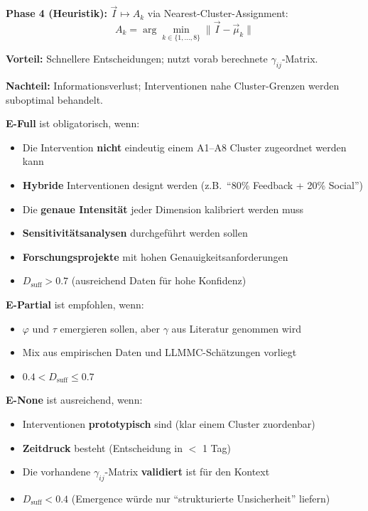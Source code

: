 \textbf{Phase 4 (Heuristik):} $\vec{I} \mapsto A_k$ via Nearest-Cluster-Assignment:
\begin{equation}
A_k = \arg\min_{k \in \{1,...,8\}} \|\vec{I} - \vec{\mu}_k\|
\end{equation}

\textbf{Vorteil:} Schnellere Entscheidungen; nutzt vorab berechnete $\gamma_{ij}$-Matrix.

\textbf{Nachteil:} Informationsverlust; Interventionen nahe Cluster-Grenzen werden suboptimal behandelt.

\begin{tcolorbox}[colback=yellow!5!white, colframe=yellow!75!black,
    title=\textbf{Wann welchen Emergenz-Modus wählen?}]

\textbf{E-Full} ist obligatorisch, wenn:
\begin{itemize}[nosep]
\item Die Intervention \textbf{nicht} eindeutig einem A1--A8 Cluster zugeordnet werden kann
\item \textbf{Hybride} Interventionen designt werden (z.B.\ ``80\% Feedback + 20\% Social'')
\item Die \textbf{genaue Intensität} jeder Dimension kalibriert werden muss
\item \textbf{Sensitivitätsanalysen} durchgeführt werden sollen
\item \textbf{Forschungsprojekte} mit hohen Genauigkeitsanforderungen
\item $D_{\text{suff}} > 0.7$ (ausreichend Daten für hohe Konfidenz)
\end{itemize}

\textbf{E-Partial} ist empfohlen, wenn:
\begin{itemize}[nosep]
\item $\varphi$ und $\tau$ emergieren sollen, aber $\gamma$ aus Literatur genommen wird
\item Mix aus empirischen Daten und LLMMC-Schätzungen vorliegt
\item $0.4 < D_{\text{suff}} \leq 0.7$
\end{itemize}

\textbf{E-None} ist ausreichend, wenn:
\begin{itemize}[nosep]
\item Interventionen \textbf{prototypisch} sind (klar einem Cluster zuordenbar)
\item \textbf{Zeitdruck} besteht (Entscheidung in $<$ 1 Tag)
\item Die vorhandene $\gamma_{ij}$-Matrix \textbf{validiert} ist für den Kontext
\item $D_{\text{suff}} < 0.4$ (Emergence würde nur ``strukturierte Unsicherheit'' liefern)
\end{itemize}

\end{tcolorbox}

